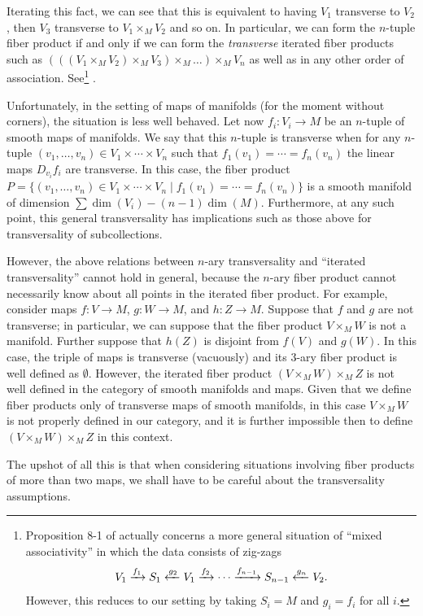 \begin{remark}
	Iterating this fact, we can see that this is equivalent to having $V_1$ transverse to $V_2$, then $V_3$ transverse to $V_1\times_MV_2$ and so on.
	In particular, we can form the $n$-tuple fiber product if and only if we can form the {\it transverse} iterated fiber products such as $(((V_1\times_MV_2)\times_M V_3)\times_M\ldots)\times_M V_n$ as well as in any other order of association.
 	See\footnote{Proposition 8-1 of \cite{RamBas09} actually concerns a more general situation of ``mixed associativity'' in which the data consists of zig-zags
	$$V_1\xrightarrow{f_1}S_1\xleftarrow{g_2}V_1\xrightarrow{f_2}\cdots\xrightarrow{f_{n-1}}S_{n-1}\xleftarrow{g_n}V_2.$$
	However, this reduces to our setting by taking $S_i=M$ and $g_i=f_i$ for all $i$.} \cite[Propositions~4-9 and 8-1]{RamBas09}.

	Unfortunately, in the setting of maps of manifolds (for the moment without corners), the situation is less well behaved.
	Let now $f_i \colon V_i\to M$ be an $n$-tuple of smooth maps of manifolds.
	We say that this $n$-tuple is transverse when for any $n$-tuple $(v_1,\ldots, v_n)\in V_1\times\cdots \times V_n$ such that $f_1(v_1)=\cdots=f_n(v_n)$ the linear maps $D_{v_i}f_i$ are transverse.
	In this case, the fiber product $P=\{(v_1,\ldots, v_n)\in V_1\times\cdots \times V_n\mid f_1(v_1)=\cdots=f_n(v_n)\}$ is a smooth manifold of dimension $\sum\dim(V_i)-(n-1)\dim(M)$.
	Furthermore, at any such point, this general transversality has implications such as those above for transversality of subcollections.

	However, the above relations between $n$-ary transversality and ``iterated transversality'' cannot hold in general, because the $n$-ary fiber product cannot necessarily know about all points in the iterated fiber product.
	For example, consider maps $f \colon V\to M$, $g \colon W\to M$, and $h \colon Z\to M$.
	Suppose that $f$ and $g$ are not transverse; in particular, we can suppose that the fiber product $V\times_MW$ is not a manifold.
	Further suppose that $h(Z)$ is disjoint from $f(V)$ and $g(W)$.
	In this case, the triple of maps is transverse (vacuously) and its 3-ary fiber product is well defined as $\emptyset$.
	However, the iterated fiber product $(V\times_MW)\times_M Z$ is not well defined in the category of smooth manifolds and maps.
	Given that we define fiber products only of transverse maps of smooth manifolds, in this case $V\times_M W$ is not properly defined in our category, and it is further impossible then to define $(V\times_MW)\times_M Z$ in this context.

	The upshot of all this is that when considering situations involving fiber products of more than two maps, we shall have to be careful about the transversality assumptions.
\end{remark}

